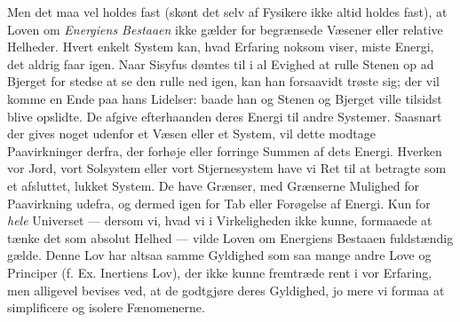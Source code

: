 \documentclass[12pt,a4paper,openany]{book}
\newcommand{\opage}[1]{\marginnote{\footnotesize\textit{[#1]}}}
\begin{document}
Men det maa vel holdes fast (skønt det selv af Fysikere ikke altid
holdes fast), at Loven om \emph{Energiens Bestaaen} ikke gælder for
begrænsede Væsener eller relative Helheder. Hvert enkelt System kan,
hvad Erfaring noksom viser, miste Energi, det aldrig faar igen. Naar
Sisyfus dømtes til i al
\opage{40}Evighed at rulle Stenen op ad Bjerget for stedse at se den
rulle ned igen, kan han forsaavidt trøste sig; der vil komme en Ende paa
hans Lidelser: baade han og Stenen og Bjerget ville tilsidst blive
opslidte. De afgive efterhaanden deres Energi til andre Systemer.
Saasnart der gives noget udenfor et Væsen eller et System, vil dette
modtage Paavirkninger derfra, der forhøje eller forringe Summen af dets
Energi. Hverken vor Jord, vort Solsystem eller vort Stjernesystem have
vi Ret til at betragte som et afsluttet, lukket System. De have Grænser,
med Grænserne Mulighed for Paavirkning udefra, og dermed igen for Tab
eller Forøgelse af Energi. Kun for \emph{hele} Universet --- dersom vi,
hvad vi i Virkeligheden ikke kunne, formaaede at tænke det som absolut
Helhed --- vilde Loven om Energiens Bestaaen fuldstændig gælde. Denne
Lov har altsaa samme Gyldighed som saa mange andre Love og Principer (f.
Ex. Inertiens Lov), der ikke kunne fremtræde rent i vor Erfaring, men
alligevel bevises ved, at de godtgjøre deres Gyldighed, jo mere vi
formaa at simplificere og isolere Fænomenerne.
\end{document}
